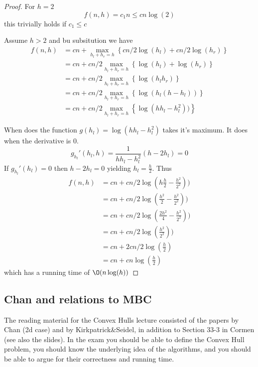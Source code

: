 \documentclass[10pt]{article}
\begin{document}
\begin{proof}

  For $h=2$                
  \begin{equation}
    f(n,h) = c_1n \leq cn\log(2)
  \end{equation}
  this trivially holds if $c_1 \leq c$
  
  Assume $h>2$ and bu subsitution we have
  \begin{align*}
   f(n,h) &= cn + \max_{h_l+h_r = h}\left\{cn/2\log(h_l)+cn/2\log(h_r)\right\} \\
          &= cn + cn/2\max_{h_l+h_r = h}\left\{\log(h_l)+\log(h_r)\right\} \\
          &= cn + cn/2\max_{h_l+h_r = h}\left\{\log(h_lh_r)\right\} \\          
          &= cn + cn/2\max_{h_l+h_r = h}\left\{\log(h_l(h-h_l))\right\} \\         
          &= cn + cn/2\max_{h_l+h_r = h}\left\{\log(hh_l-h_l^2))\right\}                    
  \end{align*}
    
  When does the function $g(h_l) = \log(hh_l-h_l^2)$ takes it's maximum. It does when the derivative is $0$.
  \begin{equation}
    g_{h_l}'(h_l,h) = \frac{1}{hh_l-h_l^2} (h-2h_l) = 0 
  \end{equation}
  If $g_{h_l}'(h_l)=0$ then $h-2h_l=0$ yielding $h_l = \frac{h}{2}$. Thus
  \begin{align*}
   f(n,h) &= cn + cn/2\log(h\frac{h}{2}-\frac{h^2}{2^2})) \\
          &= cn + cn/2\log(\frac{h^2}{2}-\frac{h^2}{2^2})) \\   
          &= cn + cn/2\log(\frac{2h^2}{4}-\frac{h^2}{2^2})) \\
          &= cn + cn/2\log(\frac{h^2}{2^2})) \\                       
          &= cn + 2cn/2\log(\frac{h}{2}) \\                                 
          &= cn + cn\log(\frac{h}{2})                                 
  \end{align*}
   which has a running time of $\O(n\log(h))$
   
\end{proof}



\subsection{Chan and relations to MBC} %
\label{sub:chan_and_relations_to_mbc}
The reading material for the Convex Hulls lecture consisted of the papers by Chan (2d case) and by Kirkpatrick\&Seidel, in addition to Section 33-3 in Cormen (see also the slides). In the exam you should be able to define the Convex Hull problem, you should know the underlying idea of the algorithms, and you should be able to argue for their correctness and running time.
\end{document}
